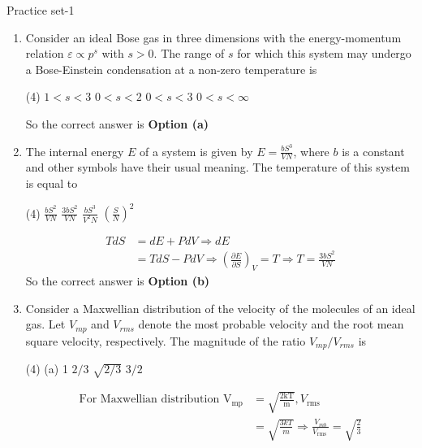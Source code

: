 
\begin{abox}
	Practice set-1
\end{abox}
\begin{enumerate}
	\item Consider an ideal Bose gas in three dimensions with the energy-momentum relation $\varepsilon \propto p^{s}$ with $s>0$. The range of $s$ for which this system may undergo a Bose-Einstein condensation at a non-zero temperature is
	{}
	\begin{tasks}(4)
		\task[\textbf{a.}] $1<s<3$
		\task[\textbf{b.}] $0<s<2$
		\task[\textbf{c.}] $0<s<3$
		\task[\textbf{d.}] $0<s<\infty$
	\end{tasks}
\begin{answer}
	So the correct answer is \textbf{Option (a)}
\end{answer}
	\item The internal energy $E$ of a system is given by $E=\frac{b S^{3}}{V N}$, where $b$ is a constant and other symbols have their usual meaning. The temperature of this system is equal to
	{}
	\begin{tasks}(4)
		\task[\textbf{a.}] $\frac{b S^{2}}{V N}$
		\task[\textbf{b.}] $\frac{3 b S^{2}}{V N}$
		\task[\textbf{c.}]  $\frac{b S^{3}}{V^{2} N}$
		\task[\textbf{d.}] $\left(\frac{S}{N}\right)^{2}$
	\end{tasks}
\begin{answer}
	\begin{align*}
	T d S&=d E+P d V \Rightarrow d E\\&=T d S-P d V \Rightarrow\left(\frac{\partial E}{\partial S}\right)_{V}=T \Rightarrow T=\frac{3 b S^{2}}{V N}
	\end{align*}
	So the correct answer is \textbf{Option (b)}
\end{answer}
	\item Consider a Maxwellian distribution of the velocity of the molecules of an ideal gas. Let $V_{m p}$ and $V_{r m s}$ denote the most probable velocity and the root mean square velocity, respectively. The magnitude of the ratio $V_{m p} / V_{r m s}$ is
	{}
	\begin{tasks}(4)
		\task[\textbf{a.}] (a) 1
		\task[\textbf{b.}] $2 / 3$
		\task[\textbf{c.}] $\sqrt{2 / 3}$
		\task[\textbf{d.}] $3 / 2$
	\end{tasks}
\begin{answer}
	\begin{align*}
	\text{For Maxwellian distribution }\mathrm{V}_{\mathrm{mp}}&=\sqrt{\frac{2 \mathrm{kT}}{\mathrm{m}}}, V_{\text {rms }}\\&=\sqrt{\frac{3 k T}{m}} \Rightarrow \frac{V_{m b}}{V_{\text {rms }}}=\sqrt{\frac{2}{3}}

\end{align*}
\end{answer}
\end{enumerate}
